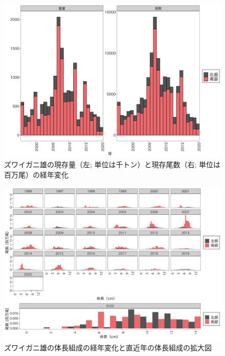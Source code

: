 \documentclass[11pt]{article} %
\begin{document}
\begin{linenumbers}
\begin{figure}[h]
  \centering
  \includegraphics[width = 14cm]{ズワイガニ雄trend.png}
  \caption{ズワイガニ雄の現存量（左; 単位は千トン）と現存尾数（右; 単位は百万尾）の経年変化}
\end{figure}

\begin{figure}[h]
  \centering
  \includegraphics[width = 14cm]{ズワイガニ雄length.png}
  \caption{ズワイガニ雄の体長組成の経年変化と直近年の体長組成の拡大図}
\end{figure}


\end{linenumbers}
\end{document}
